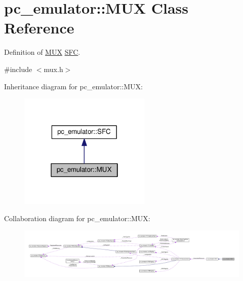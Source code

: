 \hypertarget{classpc__emulator_1_1MUX}{}\section{pc\+\_\+emulator\+:\+:M\+UX Class Reference}
\label{classpc__emulator_1_1MUX}


Definition of \hyperlink{classpc__emulator_1_1MUX}{M\+UX} \hyperlink{classpc__emulator_1_1SFC}{S\+FC}.  




{\ttfamily \#include $<$mux.\+h$>$}



Inheritance diagram for pc\+\_\+emulator\+:\+:M\+UX\+:\nopagebreak
\begin{figure}[H]
\begin{center}
\leavevmode
\includegraphics[width=178pt]{classpc__emulator_1_1MUX__inherit__graph}
\end{center}
\end{figure}


Collaboration diagram for pc\+\_\+emulator\+:\+:M\+UX\+:\nopagebreak
\begin{figure}[H]
\begin{center}
\leavevmode
\includegraphics[width=350pt]{classpc__emulator_1_1MUX__coll__graph}
\end{center}
\end{figure}
